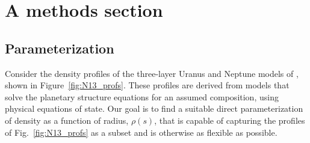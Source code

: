 
\section{A methods section}\label{sec:method}
\subsection{Parameterization}\label{sec:params}
Consider the density profiles of the three-layer Uranus and Neptune models of
\citet{Nettelmann2013a}, shown in Figure~\ref{fig:N13_profs}. These profiles are
derived from models that solve the planetary structure equations for an assumed
composition, using physical equations of state. Our goal is to find a suitable
direct parameterization of density as a function of radius, $\rho(s)$, that is
capable of capturing the profiles of Fig.~\ref{fig:N13_profs} as a subset and is
otherwise as flexible as possible. 
